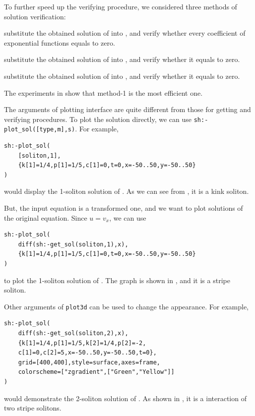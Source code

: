 To further speed up the verifying procedure, we considered three methods of solution verification:
\begin{compactenum}[method-1:]
\item substitute the obtained solution of  into , and verify whether every coefficient of exponential functions equals to zero.
\item substitute the obtained solution of  into , and verify whether it equals to zero.
\item substitute the obtained solution of  into , and verify whether it equals to zero.
\end{compactenum}
The experiments in  show that method-1 is the most efficient one.

The arguments of plotting interface are quite different from those for getting and verifying procedures. To plot the solution directly, we can use \texttt{sh:-plot\_sol([type,m],s)}. For example, 
\begin{verbatim}
sh:-plot_sol(
    [soliton,1],
    {k[1]=1/4,p[1]=1/5,c[1]=0,t=0,x=-50..50,y=-50..50}
)
\end{verbatim}
would display the 1-soliton solution of . As we can see from , it is a kink soliton.

But, the input equation is a transformed one, and we want to plot solutions of the original equation. Since $u=v_x$, we can use 
\begin{verbatim}
sh:-plot_sol(
    diff(sh:-get_sol(soliton,1),x),
    {k[1]=1/4,p[1]=1/5,c[1]=0,t=0,x=-50..50,y=-50..50}
)
\end{verbatim} 
to plot the 1-soliton solution of . The graph is shown in , and it is a stripe soliton.

Other arguments of \texttt{plot3d} can be used to change the appearance. For example, 
\begin{verbatim}
sh:-plot_sol(
    diff(sh:-get_sol(soliton,2),x),
    {k[1]=1/4,p[1]=1/5,k[2]=1/4,p[2]=-2,
    c[1]=0,c[2]=5,x=-50..50,y=-50..50,t=0},
    grid=[400,400],style=surface,axes=frame,
    colorscheme=["zgradient",["Green","Yellow"]]
)
\end{verbatim} 
would demonstrate the 2-soliton solution of . As shown in , it is a interaction of two stripe solitons. 

